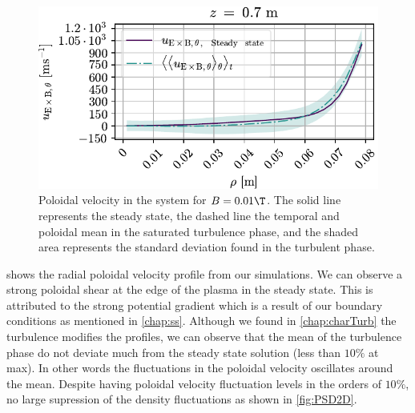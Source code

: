 %
\begin{figure}[htbp]
    \centering
    \includegraphics{fig/results/poloidalFlow/poloidalFlow01}
    \caption{Poloidal velocity in the system for $B=0.01\T$.
    The solid line represents the steady state, the dashed line the temporal and poloidal mean in the saturated turbulence phase, and the shaded area represents the standard deviation found in the turbulent phase.}
    \label{fig:poloidalFlow0008}
\end{figure}
%
 shows the radial poloidal velocity profile from our simulations.
We can observe a strong poloidal shear at the edge of the plasma in the steady state.
This is attributed to the strong potential gradient which is a result of our boundary conditions as mentioned in \cref{chap:ss}.
Although we found in \cref{chap:charTurb} the turbulence modifies the profiles, we can observe that the mean of the turbulence phase do not deviate much from the steady state solution (less than $10\%$ at max).
In other words the fluctuations in the poloidal velocity oscillates around the mean.
Despite having poloidal velocity fluctuation levels in the orders of $10\%$, no large supression of the density fluctuations as shown in \cref{fig:PSD2D}.
%
